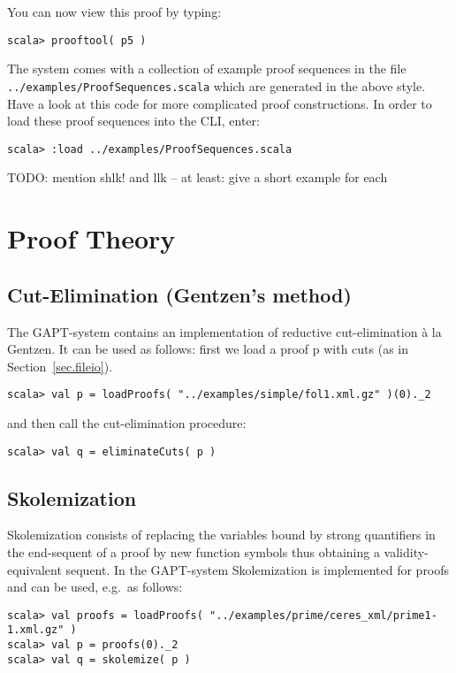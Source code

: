 \documentclass[a4paper,11pt]{article}
\newcommand{\cli}[1]{{\tt {#1}}}
\newenvironment{meta}{\color{red}}{\color{black}}
\begin{document}
%
You can now view this proof by typing:
\begin{lstlisting}
scala> prooftool( p5 )
\end{lstlisting}

The system comes with a collection of example proof sequences in the file
\cli{../examples/ProofSequences.scala} which are generated in the above style.
Have a look at this code for more complicated proof constructions. In order
to load these proof sequences into the CLI, enter:
\begin{lstlisting}
scala> :load ../examples/ProofSequences.scala
\end{lstlisting}

\begin{meta}
TODO: mention shlk! and llk -- at least: give a short example for each
\end{meta}


\section{Proof Theory}

\subsection{Cut-Elimination (Gentzen's method)}

The GAPT-system contains an implementation of reductive cut-elimination
\`{a} la Gentzen. It can be used as follows: first we load a proof p
with cuts (as in Section~\ref{sec.fileio}).
%
\begin{lstlisting}
scala> val p = loadProofs( "../examples/simple/fol1.xml.gz" )(0)._2
\end{lstlisting}
%
and then call the cut-elimination procedure:
\begin{lstlisting}
scala> val q = eliminateCuts( p )
\end{lstlisting}


\subsection{Skolemization}

Skolemization consists of replacing the variables bound by strong quantifiers in the end-sequent of a proof
by new function symbols thus obtaining a validity-equivalent sequent. In the GAPT-system Skolemization
is implemented for proofs and can be used, e.g.~as follows:
%
\begin{lstlisting}
scala> val proofs = loadProofs( "../examples/prime/ceres_xml/prime1-1.xml.gz" )
scala> val p = proofs(0)._2
scala> val q = skolemize( p )
\end{lstlisting}
\end{document}
